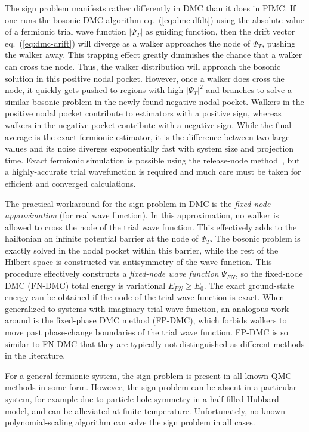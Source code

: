 The sign problem manifests rather differently in DMC than it does in PIMC.
If one runs the bosonic DMC algorithm eq.~(\ref{eq:dmc-dfdt}) using the absolute value of a fermionic trial wave function $\vert\Psi_T\vert$ as guiding function, then the drift vector eq.~(\ref{eq:dmc-drift}) will diverge as a walker approaches the node of $\Psi_T$, pushing the walker away.
This trapping effect greatly diminishes the chance that a walker can cross the node.
Thus, the walker distribution will approach the bosonic solution in this positive nodal pocket.
However, once a walker does cross the node, it quickly gets pushed to regions with high $\vert\Psi_T\vert^2$ and branches to solve a similar bosonic problem in the newly found negative nodal pocket.
Walkers in the positive nodal pocket contribute to estimators with a positive sign, whereas walkers in the negative pocket contribute with a negative sign.
While the final average is the exact fermionic estimator, it is the difference between two large values and its noise diverges exponentially fast with system size and projection time.
Exact fermionic simulation is possible using the release-node method~\cite{Ceperley1978}, but a highly-accurate trial wavefunction is required and much care must be taken for efficient and converged calculations.

The practical workaround for the sign problem in DMC is the \textit{fixed-node approximation} (for real wave function).
In this approximation, no walker is allowed to cross the node of the trial wave function.
This effectively adds to the hailtonian an infinite potential barrier at the node of $\Psi_T$.
The bosonic problem is exactly solved in the nodal pocket within this barrier, while the rest of the Hilbert space is constructed via antisymmetry of the wave function.
This procedure effectively constructs a \emph{fixed-node wave function} $\Psi_{FN}$, so the fixed-node DMC (FN-DMC) total energy is variational $E_{FN}\ge E_0$.
The exact ground-state energy can be obtained if the node of the trial wave function is exact.
When generalized to systems with imaginary trial wave function, an analogous work around is the fixed-phase DMC method (FP-DMC), which forbids walkers to move past phase-change boundaries of the trial wave function.
FP-DMC is so similar to FN-DMC that they are typically not distinguished as different methods in the literature.

For a general fermionic system, the sign problem is present in all known QMC methods in some form.
However, the sign problem can be absent in a particular system, for example due to particle-hole symmetry in a half-filled Hubbard model, and can be alleviated at finite-temperature.
Unfortunately, no known polynomial-scaling algorithm can solve the sign problem in all cases.